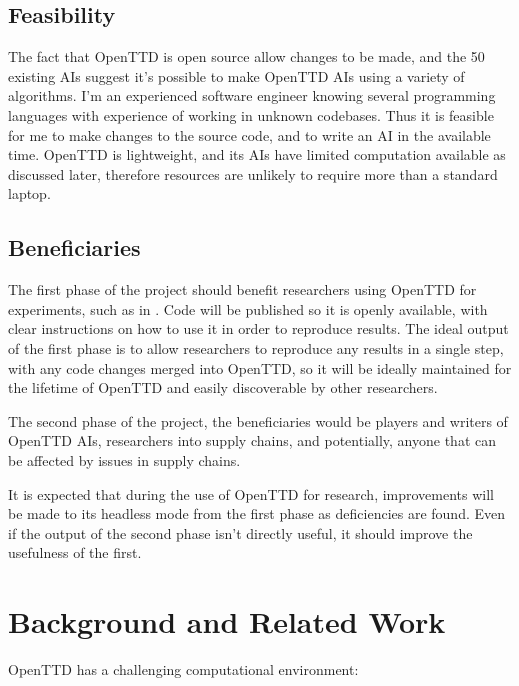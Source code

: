 \documentclass[a4paper,11pt]{article}
\begin{document}
\subsection{Feasibility}

The fact that OpenTTD is open source allow changes to be made, and the 50 existing AIs suggest it's possible to make OpenTTD AIs using a variety of algorithms. I'm an experienced software engineer knowing several programming languages with experience of working in unknown codebases. Thus it is feasible for me to make changes to the source code, and to write an AI in the available time. OpenTTD is lightweight, and its AIs have limited computation available as discussed later, therefore resources are unlikely to require more than a standard laptop.

\subsection{Beneficiaries}

The first phase of the project should benefit researchers using OpenTTD for experiments, such as in \cite{rios_trains_2009, wisniewski_artificial, shen_rtsenv_2011}. Code will be published so it is openly available, with clear instructions on how to use it in order to reproduce results. The ideal output of the first phase is to allow researchers to reproduce any results in a single step, with any code changes merged into OpenTTD, so it will be ideally maintained for the lifetime of OpenTTD and easily discoverable by other researchers.

The second phase of the project, the beneficiaries would be players and writers of OpenTTD AIs, researchers into supply chains, and potentially, anyone that can be affected by issues in supply chains.

It is expected that during the use of OpenTTD for research, improvements will be made to its headless mode from the first phase as deficiencies are found. Even if the output of the second phase isn't directly useful, it should improve the usefulness of the first.

\section{Background and Related Work}

OpenTTD has a challenging computational environment:
\end{document}
